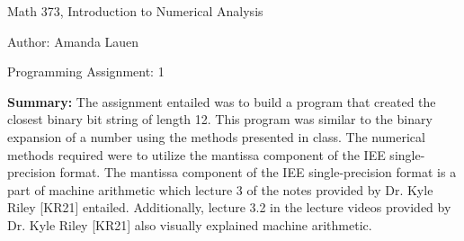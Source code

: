 \documentclass{article}
\begin{document}
\large

{\Large Math 373, Introduction to Numerical Analysis}

\begin{center}
{\Large Author: \hfill Amanda Lauen} %
\end{center}
\par \medskip \par
{\Large Programming Assignment: 1} 
\par \bigskip \par

{\bf Summary:} {\color{black} The assignment entailed was to build a program that created the closest binary bit string of length 12.  This program was similar to the binary expansion of a number using the methods presented in class.  The numerical methods required were to utilize the mantissa component of the IEE single-precision format.  The mantissa component of the IEE single-precision format is a part of machine arithmetic which lecture 3 of the notes provided by Dr. Kyle Riley [KR21] entailed.  Additionally, lecture 3.2 in the lecture videos provided by Dr. Kyle Riley [KR21] also visually explained machine arithmetic.} 
\par \bigskip \par
\end{document}
